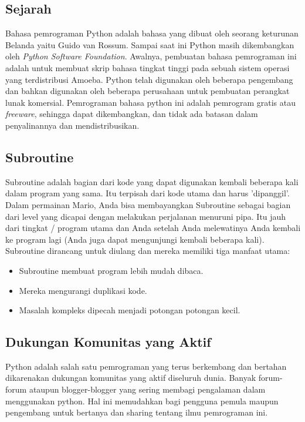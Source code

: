\subsection {Sejarah}
Bahasa pemrograman Python adalah bahasa yang dibuat oleh seorang keturunan Belanda yaitu Guido van Rossum. Sampai saat ini Python masih dikembangkan oleh \textit{Python Software Foundation}. Awalnya, pembuatan bahasa pemrograman ini adalah untuk membuat skrip bahasa tingkat tinggi pada sebuah sistem operasi yang terdistribusi Amoeba. Python telah digunakan oleh beberapa pengembang dan bahkan digunakan oleh beberapa perusahaan untuk pembuatan perangkat lunak komersial. Pemrograman bahasa python ini adalah pemrogram gratis atau \textit{freeware}, sehingga dapat dikembangkan, dan tidak ada batasan dalam penyalinannya dan mendistribusikan.

\subsection {Subroutine}
Subroutine adalah bagian dari kode yang dapat digunakan kembali beberapa kali dalam program yang sama. Itu terpisah dari kode utama dan harus 'dipanggil'. Dalam permainan Mario, Anda bisa membayangkan Subroutine sebagai bagian dari level yang dicapai dengan melakukan perjalanan menuruni pipa. Itu jauh dari tingkat / program utama dan Anda setelah Anda melewatinya Anda kembali ke program lagi (Anda juga dapat mengunjungi kembali beberapa kali). Subroutine dirancang untuk diulang dan mereka memiliki tiga manfaat utama:
\begin{itemize}
    \item Subroutine membuat program lebih mudah dibaca.
    \item Mereka mengurangi duplikasi kode.
    \item Masalah kompleks dipecah menjadi potongan potongan kecil.
\end{itemize}

\subsection{Dukungan Komunitas yang Aktif}
Python adalah salah satu pemrograman yang terus berkembang dan bertahan dikarenakan dukungan komunitas yang aktif diseluruh dunia. Banyak forum-forum ataupun blogger-blogger yang sering membagi pengalaman dalam menggunakan python. Hal ini memudahkan bagi pengguna pemula maupun pengembang untuk bertanya dan sharing tentang ilmu pemrograman ini.

